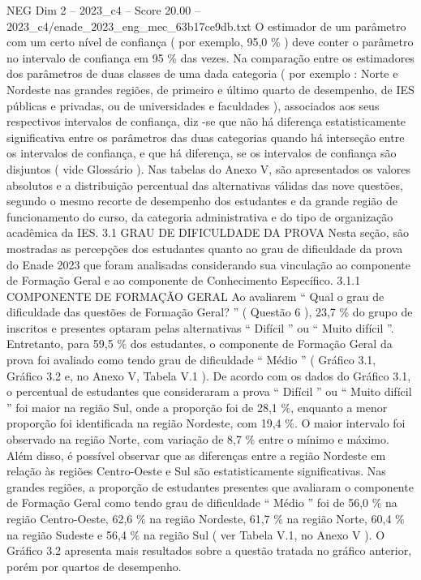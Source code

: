 \begin{textsample}{NEG Dim 2 – 2023\_c4 – Score 20.00 – 2023\_c4/enade\_2023\_eng\_mec\_63b17ce9db.txt}
O estimador de um parâmetro com um certo nível de confiança ( por exemplo, 95,0 \% ) deve conter o parâmetro no intervalo de confiança em 95 \% das vezes.
Na comparação entre os estimadores dos parâmetros de duas classes de uma dada categoria ( por exemplo : Norte e Nordeste nas grandes regiões, de primeiro e último quarto de desempenho, de IES públicas e privadas, ou de universidades e faculdades ), associados aos seus respectivos intervalos de confiança, diz -se que não há diferença estatisticamente significativa entre os parâmetros das duas categorias quando há interseção entre os intervalos de confiança, e que há diferença, se os intervalos de confiança são disjuntos ( vide Glossário ).
Nas tabelas do Anexo V, são apresentados os valores absolutos e a distribuição percentual das alternativas válidas das nove questões, segundo o mesmo recorte de desempenho dos estudantes e da grande região de funcionamento do curso, da categoria administrativa e do tipo de organização acadêmica da IES. 3.1 GRAU DE DIFICULDADE DA PROVA Nesta seção, são mostradas as percepções dos estudantes quanto ao grau de dificuldade da prova do Enade 2023 que foram analisadas considerando sua vinculação ao componente de Formação Geral e ao componente de Conhecimento Específico. 3.1.1 COMPONENTE DE FORMAÇÃO GERAL Ao avaliarem “ Qual o grau de dificuldade das questões de Formação Geral? ” ( Questão 6 ), 23,7 \% do grupo de inscritos e presentes optaram pelas alternativas “ Difícil ” ou “ Muito difícil ”.
Entretanto, para 59,5 \% dos estudantes, o componente de Formação Geral da prova foi avaliado como tendo grau de dificuldade “ Médio ” ( Gráfico 3.1, Gráfico 3.2 e, no Anexo V, Tabela V.1 ).
De acordo com os dados do Gráfico 3.1, o percentual de estudantes que consideraram a prova “ Difícil ” ou “ Muito difícil ” foi maior na região Sul, onde a proporção foi de 28,1 \%, enquanto a menor proporção foi identificada na região Nordeste, com 19,4 \%.
O maior intervalo foi observado na região Norte, com variação de 8,7 \% entre o mínimo e máximo.
Além disso, é possível observar que as diferenças entre a região Nordeste em relação às regiões Centro-Oeste e Sul são estatisticamente significativas.
Nas grandes regiões, a proporção de estudantes presentes que avaliaram o componente de Formação Geral como tendo grau de dificuldade “ Médio ” foi de 56,0 \% na região Centro-Oeste, 62,6 \% na região Nordeste, 61,7 \% na região Norte, 60,4 \% na região Sudeste e 56,4 \% na região Sul ( ver Tabela V.1, no Anexo V ).
O Gráfico 3.2 apresenta mais resultados sobre a questão tratada no gráfico anterior, porém por quartos de desempenho.

\end{textsample}
